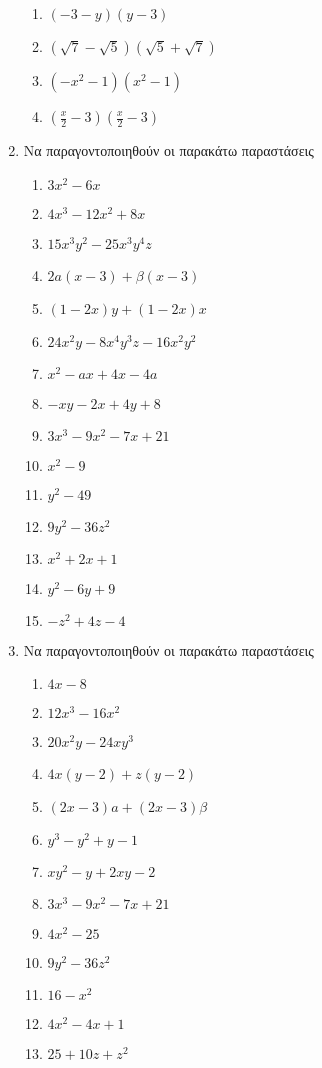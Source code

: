 \documentclass[twoside,nofonts,internet]{askhseis}
\begin{document}
\begin{enumerate}
\begin{multicols}{3}
\begin{enumerate}[label=\roman*.]
\item $ (-3-y)(y-3) $
\item $ (\sqrt{7}-\sqrt{5})(\sqrt{5}+\sqrt{7}) $
\item $ (-x^2-1)(x^2-1) $
\item $ \left(\frac{x}{2}-3 \right) \left(\frac{x}{2}-3 \right)  $
\end{enumerate}
\end{multicols}
\item Να παραγοντοποιηθούν οι παρακάτω παραστάσεις
\begin{multicols}{3}
\begin{enumerate}[label=\roman*.]
\item $ 3x^2-6x $
\item $ 4x^3-12x^2+8x $
\item $ 15x^3y^2-25x^3y^4z $
\item $ 2a(x-3)+\beta(x-3) $
\item $ (1-2x)y+(1-2x)x $
\item $ 24x^2y-8x^4y^3z-16x^2y^2 $
\item $ x^2-ax+4x-4a $
\item $ -xy-2x+4y+8 $
\item $ 3x^3-9x^2-7x+21 $
\item $ x^2-9 $
\item $ y^2-49 $
\item $ 9y^2-36z^2 $
\item $ x^2+2x+1 $
\item $ y^2-6y+9 $
\item $ -z^2+4z-4 $
\end{enumerate}
\end{multicols}
\item Να παραγοντοποιηθούν οι παρακάτω παραστάσεις
\begin{multicols}{3}
\begin{enumerate}[label=\roman*.]
\item $ 4x-8 $
\item $ 12x^3-16x^2 $
\item $ 20x^2y-24xy^3 $
\item $ 4x(y-2)+z(y-2) $
\item $ (2x-3)a+(2x-3)\beta $
\item $ y^3-y^2+y-1 $
\item $ xy^2-y+2xy-2 $
\item $ 3x^3-9x^2-7x+21 $
\item $ 4x^2-25 $
\item $ 9y^2-36z^2 $
\item $ 16-x^2 $
\item $ 4x^2-4x+1 $
\item $ 25+10z+z^2 $
\end{enumerate}
\end{multicols}
\end{enumerate}
\end{document}

